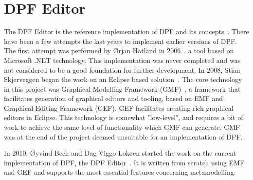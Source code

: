 
\section{DPF Editor}

The DPF Editor is the reference implementation of DPF and its concepts~\cite{DPF_web}. There have been a few attempts the last years to implement earlier versions of DPF. The first attempt was performed by Ørjan Hatland in 2006~\cite{Hatland06}, a tool based on Microsoft .NET technology. This implementation was never completed and was not considered to be a good foundation for further development. In 2008, Stian Skjerveggen began the work on an Eclipse based solution~\cite{Skjerveggen08}. The core technology in this project was Graphical Modelling Framework (GMF)~\cite{GMP}, a framework that facilitates generation of graphical editors and tooling, based on EMF and Graphical Editing Framework (GEF). GEF facilitates creating rich graphical editors in Eclipse. This technology is somewhat "low-level", and requires a bit of work to achieve the same level of functionality which GMF can generate. GMF was at the end of the project deemed unsuitable for an implementation of DPF.

In 2010, Øyvind Bech and Dag Viggo Lokøen started the work on the current implementation of DPF, the DPF Editor~\cite{Bech11}. It is written from scratch using EMF and GEF and supports the most essential features concerning metamodelling:

